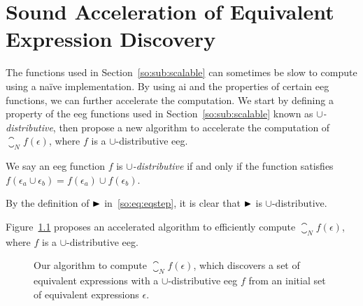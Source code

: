 \chapter{Sound Acceleration of Equivalent Expression Discovery}
\label{app:sound_acceleration}

The functions used in Section~\ref{so:sub:scalable} can sometimes be slow
to compute using a na\"ive implementation.  By using \acrlong{ai} and the
properties of certain \acrfull{eeg} functions, we can further accelerate the
computation.  We start by defining a property of the \gls{eeg} functions
used in Section~\ref{so:sub:scalable} known as \emph{$\cup$-distributive},
then propose a new algorithm to accelerate the computation of $\closure_N f
(\epsilon)$, where $f$ is a $\cup$-distributive \gls{eeg}\@.
\begin{definition}
    We say an \gls{eeg} function $f$ is \emph{$\cup$-distributive} if and only
    if the function satisfies $f(\epsilon_a \cup \epsilon_b) = f(\epsilon_a)
    \cup f(\epsilon_b)$.
\end{definition}
\begin{corollary}
    By the definition of $\operatorname{\blacktriangleright}$ in~\eqref{so:eq:eqstep}, it is clear that
    $\operatorname{\blacktriangleright}$ is $\cup$-distributive.
    {}\label{so:cor:union}
\end{corollary}

Figure~\ref{so:alg:closure} proposes an accelerated algorithm to efficiently
compute $\closure_N f(\epsilon)$, where $f$ is a $\cup$-distributive
\gls{eeg}\@.
\begin{figure}[ht]
    \centering
    \begin{algorithmic}
                \EndIf{}
            \EndFor{}
        \EndFunction{}
    \end{algorithmic}
    \caption{%
        Our algorithm to compute $\closure_N f (\epsilon)$, which discovers a
        set of equivalent expressions with a $\cup$-distributive \gls{eeg} $f$
        from an initial set of equivalent expressions $\epsilon$.
    }\label{so:alg:closure}
\end{figure}

